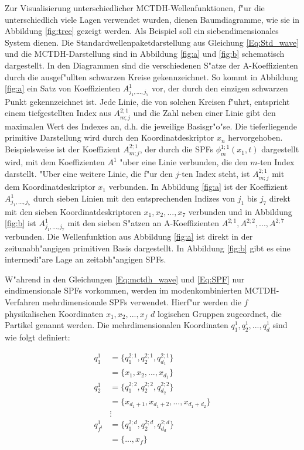 Zur Visualisierung unterschiedlicher MCTDH-Wellenfunktionen, f"ur die unterschiedlich viele Lagen verwendet wurden, dienen Baumdiagramme,
wie sie in Abbildung \ref{fig:tree} gezeigt werden.
Als Beispiel soll ein siebendimensionales System dienen.
Die Standardwellenpaketdarstellung aus Glei\-chung \ref{Eq:Std_wave} und die MCTDH-Darstellung sind in Abbildung \ref{fig:a} und \ref{fig:b} schematisch dargestellt.
In den Diagrammen sind die verschiedenen S"atze der A-Koeffizienten durch die ausgef"ullten schwarzen Kreise gekennzei\-chnet.
So kommt in Abbildung \ref{fig:a} ein Satz von Koeffizienten $A^{1}_{j_{1}, ..., j_{7}}$ vor, der durch den
einzigen schwarzen Punkt gekennzei\-chnet ist. 
Jede Linie, die von solchen Kreisen f"uhrt, entspricht einem tiefgestellten Index aus $ A^{2;1}_{m;j} $ und die Zahl neben einer Linie gibt den maximalen
Wert des Indexes an, d.h. die jeweilige Basisgr"o"se. Die tieferliegende primitive Darstellung wird durch den Koordinatdeskriptor $x_n$ hervorgehoben.
Beispielsweise ist der Koeffizient $A^{2;1}_{m;j}$, der durch die SPFs $ \phi^{1;1}_{m} (x_{1}, t) $ dargestellt wird, mit dem 
Koeffizienten $A^1$ "uber eine Linie verbunden, die den $m$-ten Index darstellt. "Uber eine weitere Linie, die f"ur den $j$-ten Index steht,
ist  $A^{2;1}_{m;j}$ mit dem Koordinatdeskriptor $x_1$ verbunden.
In Abbildung \ref{fig:a} ist der Koeffizient $A^{1}_{j_{1}, ..., j_{7}}$  durch sieben Linien mit den entsprechenden Indizes von 
$j_1$ bis $j_7$ direkt mit den sieben Koordinatdeskriptoren $x_1,x_2,...,x_7$ verbunden und in Abbildung \ref{fig:b} ist $A^{1}_{j_{1}, ..., j_{7}}$
mit den sieben S"atzen an A-Koeffizienten $A^{2;1},A^{2;2},...,A^{2;7}$ verbunden.
Die Wellenfunktion aus Abbildung \ref{fig:a} ist direkt 
in der zeitunabh"angigen primitiven Basis dargestellt. In Abbildung \ref{fig:b} gibt es eine intermedi"are Lage an zeitabh"angigen SPFs. 

W"ahrend in den Gleichungen \ref{Eq:mctdh_wave} und \ref{Eq:SPF} nur eindimensionale SPFs vorkommen, werden im modenkombinierten MCTDH-Verfahren
mehrdimensionale SPFs verwendet. 
Hier\-f"ur werden die $f$ physikalischen Koordinaten $x_{1}, x_{2}, ..., x_{f}$  $d$ logischen Gruppen zugeordnet, die Partikel genannt werden.
Die mehrdimensionalen Koordinaten $q^{1}_{1}, q^{1}_{2}, ..., q^{1}_{d}$ sind wie folgt definiert:


\begin{align*}
  q^{1}_{1} &= \{q^{2;1}_{1},q^{2;1}_{2},q^{2;1}_{d_{1}}\}\\ 
            &= \{x_{1}, x_{2}, ..., x_{d_1}\} \\
  q^{1}_{2} &= \{q^{2;2}_{1},q^{2;2}_{2},q^{2;2}_{d_{2}}\}\\ 
            &= \{x_{d_{1}+1}, x_{d_{1}+2}, ..., x_{d_{1}+d_{2}}\} \\
            &\vdots\\
  q^{1}_{f^1} &= \{q^{2;d}_{1},q^{2;d}_{2},q^{2;d}_{d_{d}}\} \\
            &= \{...,x_{f}\}
\end{align*}


